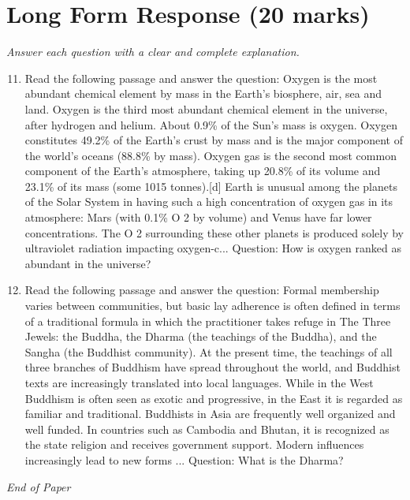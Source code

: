 \documentclass[12pt]{article}
\begin{document}
\section*{Long Form Response (20 marks)}
\textit{Answer each question with a clear and complete explanation.}
\begin{enumerate}[label=\arabic*.]
\setcounter{enumi}{10}
\item Read the following passage and answer the question: Oxygen is the most abundant chemical element by mass in the Earth's biosphere, air, sea and land. Oxygen is the third most abundant chemical element in the universe, after hydrogen and helium. About 0.9\% of the Sun's mass is oxygen. Oxygen constitutes 49.2\% of the Earth's crust by mass and is the major component of the world's oceans (88.8\% by mass). Oxygen gas is the second most common component of the Earth's atmosphere, taking up 20.8\% of its volume and 23.1\% of its mass (some 1015 tonnes).[d] Earth is unusual among the planets of the Solar System in having such a high concentration of oxygen gas in its atmosphere: Mars (with 0.1\% O 2 by volume) and Venus have far lower concentrations. The O 2 surrounding these other planets is produced solely by ultraviolet radiation impacting oxygen-c... Question: How is oxygen ranked as abundant in the universe?
\item Read the following passage and answer the question: Formal membership varies between communities, but basic lay adherence is often defined in terms of a traditional formula in which the practitioner takes refuge in The Three Jewels: the Buddha, the Dharma (the teachings of the Buddha), and the Sangha (the Buddhist community). At the present time, the teachings of all three branches of Buddhism have spread throughout the world, and Buddhist texts are increasingly translated into local languages. While in the West Buddhism is often seen as exotic and progressive, in the East it is regarded as familiar and traditional. Buddhists in Asia are frequently well organized and well funded. In countries such as Cambodia and Bhutan, it is recognized as the state religion and receives government support. Modern influences increasingly lead to new forms ... Question: What is the Dharma?
\end{enumerate}

\vfill
\noindent\textit{End of Paper}
\end{document}
